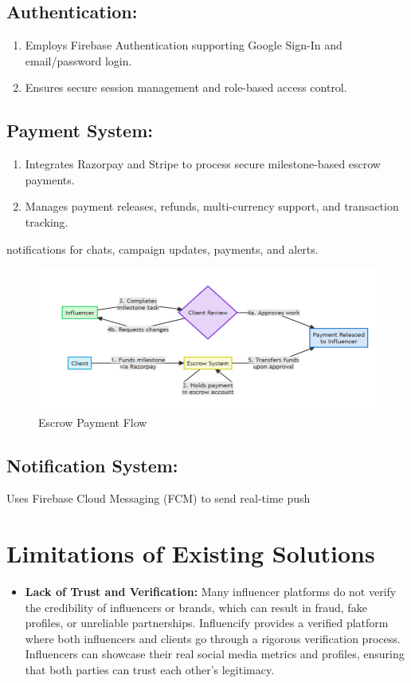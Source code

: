 \begin{justify}
\subsection{Authentication:}
\begin{enumerate}
    \item Employs Firebase Authentication supporting Google Sign-In and email/password login.
    \item 	Ensures secure session management and role-based access control.
\end{enumerate}
\subsection{Payment System:}
\begin{enumerate}
    \item Integrates Razorpay and Stripe to process secure milestone-based escrow payments.
    \item	Manages payment releases, refunds, multi-currency support, and transaction tracking.
\end{enumerate}
notifications for chats, campaign updates, payments, and alerts.
    \begin{figure}[H]
    \centering
    \includegraphics[height=0.3\textheight]{Chapters/Screenshot 2025-05-18 194646.png}
    \caption{Escrow Payment Flow}
    \label{fig:system-workflow}
\end{figure}
\subsection{	Notification System:}
	Uses Firebase Cloud Messaging (FCM) to send real-time push 
\section{Limitations of Existing Solutions}

\begin{itemize}
    \item \textbf{Lack of Trust and Verification:}
    Many influencer platforms do not verify the credibility of influencers or brands, which can result in fraud, fake profiles, or unreliable partnerships.
    Influencify provides a verified platform where both influencers and clients go through a rigorous verification process. Influencers can showcase their real social media metrics and profiles, ensuring that both parties can trust each other’s legitimacy.
    

\end{itemize}
\end{justify}

